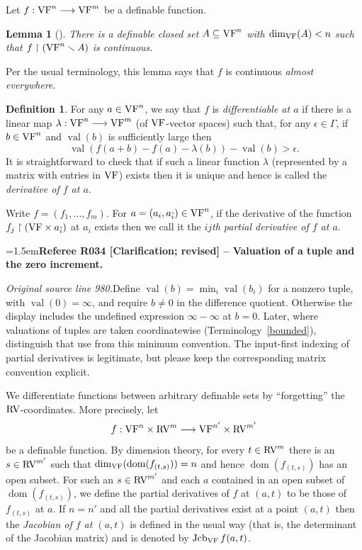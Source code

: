 \documentclass[12pt]{amsart}
\newcommand{\RefereeRemark}[4]{%
  \par\medskip\begingroup\normalfont\small\color{RefereePurple}%
  \emergencystretch=1.5em\noindent\textbf{Referee R#1 [#2] -- #3.}\par\nobreak\noindent #4\par
  \endgroup\medskip
}
\newcommand{\memph}[1]{{\color{magenta}\emph{#1}}}
\theoremstyle{plain}
\newtheorem{lem}[thm]{Lemma}
\theoremstyle{definition}
\newtheorem{defn}[thm]{Definition}
\theoremstyle{remark}
\numberwithin{equation}{section}
\theoremstyle{plain}
\newcommand{\VF}{\textup{VF}}
\newcommand{\RV}{\textup{RV}}
\DeclareMathOperator{\dom}{dom}
\DeclareMathOperator{\jcb}{Jcb}
\newcommand{\0}{\emptyset}
\newcommand{\rest}{\upharpoonright}
\newcommand{\fun}{\longrightarrow}
\newcommand{\sub}{\subseteq}
\newcommand{\mi}{\smallsetminus}
\DeclareMathOperator{\vv}{val}
\begin{document}
Let $f : \VF^n \fun \VF^m$ be a definable function.

\begin{lem}[{\cite[Lemma~8.7]{Yin:special:trans}}]\label{fun:almost:cont}
There is a definable closed set $A \sub \VF^n$ with $\dim_{\VF}(A) < n$ such that $f \rest (\VF^n \mi A)$ is continuous.
\end{lem}

Per the usual terminology, this lemma says that $f$ is continuous \memph{almost everywhere}.

\begin{defn}\label{defn:diff}
For any $a \in \VF^n$, we say that $f$ is \memph{differentiable at $a$} if there is a linear map $\lambda : \VF^n \fun \VF^m$ (of $\VF$-vector spaces) such that, for any $\epsilon \in \Gamma$, if $b \in \VF^n$ and $\vv(b)$ is sufficiently large then
\[
\vv(f(a + b) - f(a) - \lambda(b)) - \vv(b) > \epsilon.
\]
It is straightforward to check that if such a linear function $\lambda$ (represented by a matrix with entries in $\VF$) exists then it is unique and hence is called the \memph{derivative of $f$ at $a$}.

Write $f = (f_1, \ldots, f_m)$. For $a = (a_i, a_{\tilde i}) \in \VF^n$, if the derivative of the function $f_j \rest (\VF \times a_{\tilde i})$ at $a_i$ exists then we call it the \memph{$ij$th partial derivative of $f$ at $a$}.
\end{defn}

\RefereeRemark{034}{Clarification; revised}{Valuation of a tuple and the zero increment}{%
\textit{Original source line 980.}\quad Define $\vv(b)=\min_i\vv(b_i)$ for a nonzero tuple, with $\vv(0)=\infty$, and require $b\ne0$ in the difference quotient. Otherwise the display includes the undefined expression $\infty-\infty$ at $b=0$. Later, where valuations of tuples are taken coordinatewise (Terminology~\ref{bounded}), distinguish that use from this minimum convention. The input-first indexing of partial derivatives is legitimate, but please keep the corresponding matrix convention explicit.
}

We differentiate functions between arbitrary definable sets by ``forgetting'' the $\RV$-coordinates. More precisely, let
\[
f : \VF^n \times \RV^m \fun \VF^{n'} \times \RV^{m'}
\]
be a definable function. By dimension theory, for every $t \in \RV^m$ there is an $s \in \RV^{m'}$ such that $\dim_{\VF}(\dom(f_{(t, s)})) = n$ and hence $\dom(f_{(t, s)})$ has an open subset. For such an $s \in \RV^{m'}$ and each $a$ contained in an open subset of $\dom(f_{(t, s)})$, we define the partial derivatives of $f$ at $(a, t)$ to be those of $f_{(t, s)}$ at $a$. If $n = n'$ and all the partial derivatives exist at a point $(a, t)$ then the \memph{Jacobian of $f$ at $(a,t)$} is defined in the usual way (that is, the determinant of the Jacobian matrix) and is denoted by $\jcb_{\VF} f(a,t)$.
\end{document}

